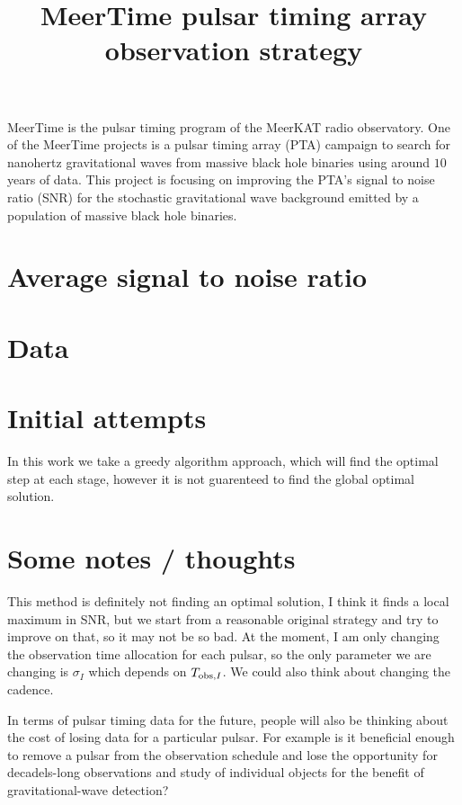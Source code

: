 \documentclass[twocolumn]{article}
\title{MeerTime pulsar timing array observation strategy}
\begin{document}
\maketitle

MeerTime is the pulsar timing program of the MeerKAT radio observatory. 
One of the MeerTime projects is a pulsar timing array (PTA) campaign to search for nanohertz gravitational waves from massive black hole binaries using around $10$ years of data. 
This project is focusing on improving the PTA's signal to noise ratio (SNR) for the stochastic gravitational wave background emitted by a population of massive black hole binaries. 



\section{Average signal to noise ratio}



\section{Data}


\section{Initial attempts}

In this work we take a greedy algorithm approach, which will find the optimal step at each stage, however it is not guarenteed to find the global optimal solution. 

\section{Some notes / thoughts}
This method is definitely not finding an optimal solution, I think it finds a local maximum in SNR, but we start from a reasonable original strategy and try to improve on that, so it may not be so bad. 
At the moment, I am only changing the observation time allocation for each pulsar, so the only parameter we are changing is $\sigma_I$ which depends on $T_{{\rm obs},I}$.
We could also think about changing the cadence. 

In terms of pulsar timing data for the future, people will also be thinking about the cost of losing data for a particular pulsar.  
For example is it beneficial enough to remove a pulsar from the observation schedule and lose the opportunity for decadels-long observations and study of individual objects for the benefit of gravitational-wave detection? 




\end{document}
